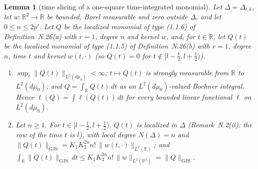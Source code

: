 \documentclass[11pt,a4paper]{article}
\newcommand{\R}{\mathbb{R}}
\newcommand{\GJS}[1]{\lVert #1\rVert_{\mathrm{GJS}}}
\newcommand{\dmu}{d\mu_0}
\theoremstyle{plain}
\newtheorem{tlemma}{Lemma}
\theoremstyle{definition}
\begin{document}
\begin{tlemma}[time slicing of a one-square time-integrated monomial]\label{lem:slice}
Let $\Delta=\Delta_{l,k}$, let $w:\R^2\to\R$ be bounded, Borel measurable and zero outside
$\Delta$, and let $0\le n\le2p'$.  Let $Q$ be the localized monomial of type (1.1.6) of
Definition~N.26(a) with $r=1$, degree $n$ and kernel $w$, and, for $t\in\R$, let $Q(t)$ be the
localized monomial of type (1.1.5) of Definition~N.26(b) with $r=1$, degree $n$, time $t$ and
kernel $w(t,\cdot)$ (so $Q(t)=0$ for $t\notin[l-\frac12,l+\frac12)$).
\begin{enumerate}
\item[\rm(i)] $\sup_t\|Q(t)\|_{L^2(\dmu)}<\infty$; $t\mapsto Q(t)$ is strongly measurable from
$\R$ to $L^2(\dmu)$; and $Q=\int_\R Q(t)\,dt$ as an $L^2(\dmu)$-valued Bochner integral.  Hence
$\ell(Q)=\int\ell(Q(t))\,dt$ for every bounded linear functional $\ell$ on $L^2(\dmu)$.
\item[\rm(ii)] Let $n\ge1$.  For $t\in[l-\frac12,l+\frac12)$, $Q(t)$ is localized in $\Delta$
(Remark~N.2(ii): the row of the time $t$ is $l$), with local degree $N(\Delta)=n$ and
$\GJS{Q(t)}=K_1K_2^{2n}n!\,\|w(t,\cdot)\|_{L^2(\R)}$; and
$\int_\R\GJS{Q(t)}\,dt\le K_1K_2^{2n}n!\,\|w\|_{L^2(\R^2)}=\GJS{Q}$.
\end{enumerate}
\end{tlemma}
\end{document}
